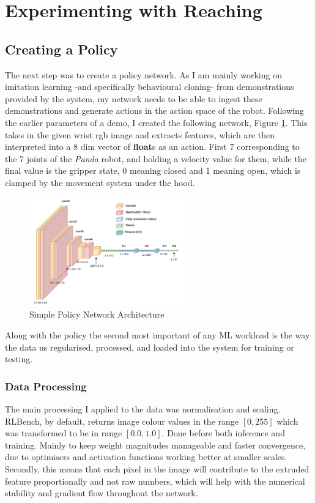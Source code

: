 \section{Experimenting with Reaching}

\subsection{Creating a Policy}
The next step was to create a policy network. As I am mainly working on imitation learning -and specifically behavioural cloning- from demonstrations provided by the system, my network needs to be able to ingest these demonstrations and generate actions in the action space of the robot. Following the earlier parameters of a demo, I created the following network, Figure \ref{fig:policy-arch}. This takes in the given wrist rgb image and extracts features, which are then interpreted into a $8$ dim vector of \textbf{float}s as an action. First $7$ corresponding to the $7$ joints of the \emph{Panda} robot, and holding a velocity value for them, while the final value is the gripper state, $0$ meaning closed and $1$ meaning open, which is clamped by the movement system under the hood.

\begin{figure}[h]
  \centering
  \includegraphics[width=0.6\textwidth]{assets/early-work/cnn-encoder-policy-head.png}
  \caption{Simple Policy Network Architecture}\label{fig:policy-arch}
\end{figure}

Along with the policy the second most important of any ML workload is the way the data us regularised, processed, and loaded into the system for training or testing.

\subsubsection{Data Processing}
The main processing I applied to the data was normalisation and scaling. RLBench, by default, returns image colour values in the range \(\left[0, 255\right]\) which was transformed to be in range \(\left[0.0, 1.0\right]\). Done before both inference and training. Mainly to keep weight magnitudes manageable and faster convergence, due to optimisers and activation functions working better at smaller scales. Secondly, this means that each pixel in the image will contribute to the extruded feature proportionally and not raw numbers, which will help with the numerical stability and gradient flow throughout the network.

